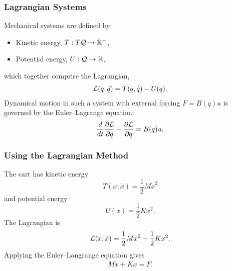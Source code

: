 \begin{frame}
  \frametitle{Lagrangian Systems}
  Mechanical systems are defined by:
  \begin{itemize}
  \item Kinetic energy, $T : T\mathcal{Q} \to \mathbb{R}^+$,\\
  \item Potential energy, $U : \mathcal{Q} \to \mathbb{R}$,
  \end{itemize}
  which together comprise the Lagrangian,
  \begin{align*}
    \mathcal{L}(q, \dot q) = T(q, \dot q) - U(q).
  \end{align*}
  Dynamical motion in such a system with external forcing $F = B(q) u$ is governed by the Euler--Lagrange equation:
  \begin{align*}
    \frac{d}{dt} \frac{\partial{\ensuremath{\mathcal{L}}}}{\partial{\ensuremath{\dot q}}} - \frac{\partial{\ensuremath{\mathcal{L}}}}{\partial{\ensuremath{q}}} = B(q) u.
  \end{align*}
\end{frame}

\begin{frame}
  \frametitle{Using the Lagrangian Method}
  The cart has kinetic energy $$T(x, {\dot x}) = \frac{1}{2} M {\dot x}^2$$ and potential energy $$U(x) = \frac{1}{2} K x^{2}.$$
The Lagrangian is
\begin{align*}
  \mathcal{L}(x, {\dot x}) = \frac{1}{2} M {\dot x}^2 - \frac{1}{2} K x^{2}.
\end{align*}
Applying the Euler--Langrange equation gives
\begin{align*}
  M {\ddot x} + K x = F.
\end{align*}
\end{frame}
